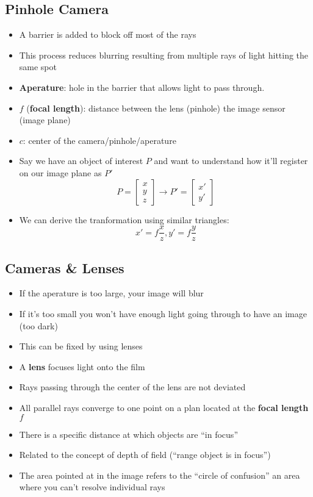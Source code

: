 \subsection{Pinhole Camera}
\begin{itemize}
	\item A barrier is added to block off most of the rays
	\item This process reduces blurring resulting from multiple rays of light hitting the same spot
	\item \textbf{Aperature}: hole in the barrier that allows light to pass through.
	\item $f$ (\textbf{focal length}): distance between the lens (pinhole) the image sensor (image plane)
	\item $c$: center of the camera/pinhole/aperature
	\item Say we have an object of interest $P$ and want to understand how it'll register on our image plane as $P'$
	$$P=\begin{bmatrix}
		x \\ y \\ z
	\end{bmatrix}\to P'=\begin{bmatrix}
		x' \\ y'
	\end{bmatrix}$$
	\item We can derive the tranformation using similar triangles:
	$$x'=f\frac{x}{z}, y'=f\frac{y}{z}$$
\end{itemize}

\subsection{Cameras \& Lenses}
\begin{itemize}
	\item If the aperature is too large, your image will blur
	\item If it's too small you won't have enough light going through to have an image (too dark)
	\item This can be fixed by using lenses 
	\item A \textbf{lens} focuses light onto the film
	\item Rays passing through the center of the lens are not deviated
	\item All parallel rays converge to one point on a plan located at the \textbf{focal length} $f$
	\item There is a specific distance at which objects are ``in focus''
	\item Related to the concept of depth of field (``range object is in focus'')
	\item The area pointed at in the image refers to the ``circle of confusion'' an area where you can't resolve individual rays
\end{itemize}

